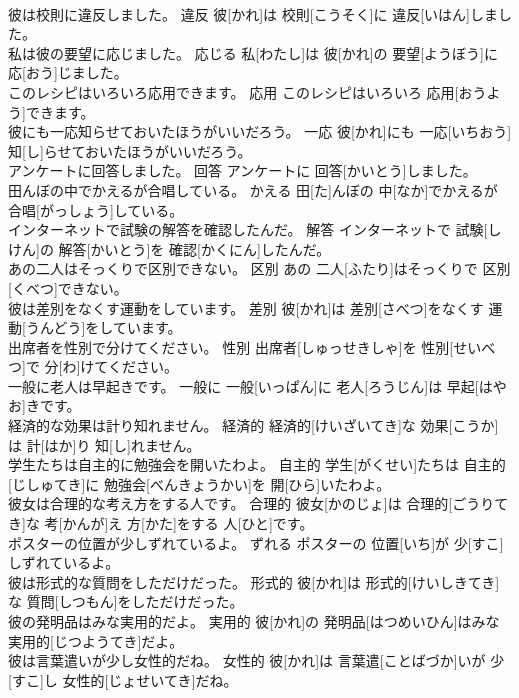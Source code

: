 \documentclass[8pt]{extreport}
\begin{document}
\begin{CJK}{UTF8}{min}
\\	彼は校則に違反しました。	違反	彼[かれ]は 校則[こうそく]に 違反[いはん]しました。	
\\	私は彼の要望に応じました。	応じる	私[わたし]は 彼[かれ]の 要望[ようぼう]に 応[おう]じました。	
\\	このレシピはいろいろ応用できます。	応用	このレシピはいろいろ 応用[おうよう]できます。	
\\	彼にも一応知らせておいたほうがいいだろう。	一応	彼[かれ]にも 一応[いちおう] 知[し]らせておいたほうがいいだろう。	
\\	アンケートに回答しました。	回答	アンケートに 回答[かいとう]しました。	
\\	田んぼの中でかえるが合唱している。	かえる	田[た]んぼの 中[なか]でかえるが 合唱[がっしょう]している。	
\\	インターネットで試験の解答を確認したんだ。	解答	インターネットで 試験[しけん]の 解答[かいとう]を 確認[かくにん]したんだ。	
\\	あの二人はそっくりで区別できない。	区別	あの 二人[ふたり]はそっくりで 区別[くべつ]できない。	
\\	彼は差別をなくす運動をしています。	差別	彼[かれ]は 差別[さべつ]をなくす 運動[うんどう]をしています。	
\\	出席者を性別で分けてください。	性別	出席者[しゅっせきしゃ]を 性別[せいべつ]で 分[わ]けてください。	
\\	一般に老人は早起きです。	一般に	一般[いっぱん]に 老人[ろうじん]は 早起[はやお]きです。	
\\	経済的な効果は計り知れません。	経済的	経済的[けいざいてき]な 効果[こうか]は 計[はか]り 知[し]れません。	
\\	学生たちは自主的に勉強会を開いたわよ。	自主的	学生[がくせい]たちは 自主的[じしゅてき]に 勉強会[べんきょうかい]を 開[ひら]いたわよ。	
\\	彼女は合理的な考え方をする人です。	合理的	彼女[かのじょ]は 合理的[ごうりてき]な 考[かんが]え 方[かた]をする 人[ひと]です。	
\\	ポスターの位置が少しずれているよ。	ずれる	ポスターの 位置[いち]が 少[すこ]しずれているよ。	
\\	彼は形式的な質問をしただけだった。	形式的	彼[かれ]は 形式的[けいしきてき]な 質問[しつもん]をしただけだった。	
\\	彼の発明品はみな実用的だよ。	実用的	彼[かれ]の 発明品[はつめいひん]はみな 実用的[じつようてき]だよ。	
\\	彼は言葉遣いが少し女性的だね。	女性的	彼[かれ]は 言葉遣[ことばづか]いが 少[すこ]し 女性的[じょせいてき]だね。	

\end{CJK}
\end{document}
